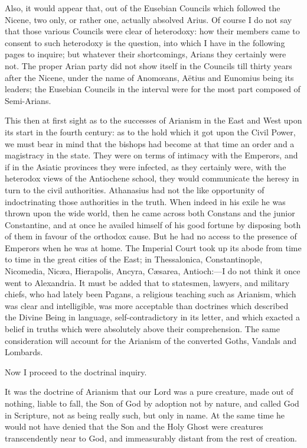 Also, it would appear that, out of the Eusebian Councils which
followed the Nicene, two only, or rather one, actually absolved Arius.
Of course I do not say that those various Councils were clear of
heterodoxy: how their members came to consent to such heterodoxy is
the question, into which I have in the following pages to inquire; but
whatever their shortcomings, Arians they certainly were not. The
proper Arian party did not show itself in the Councils till thirty
years after the Nicene, under the name of Anomœans, Aëtius and
Eunomius being its leaders; the Eusebian Councils in the interval were
for the most part composed of Semi-Arians.

This then at first sight as to the successes of Arianism in the
East and West upon its start in the fourth century: as to the hold
which it got upon the Civil Power, we must bear in mind that the
bishops had become at that time an order and a magistracy in the
state. They were on terms of intimacy with the Emperors, and if
in the Asiatic provinces they were infected, as they certainly were,
with the heterodox views of the Antiochene school, they would
communicate the heresy in turn to the civil authorities. Athanasius
had not the like opportunity of indoctrinating those authorities in
the truth. When indeed in his exile he was thrown upon the wide world,
then he came across both Constans and the junior Constantine, and at
once he availed himself of his good fortune by disposing both of them
in favour of the orthodox cause. But he had no access to the presence
of Emperors when he was at home. The Imperial Court took up its abode
from time to time in the great cities of the East; in Thessalonica,
Constantinople, Nicomedia, Nicæa, Hierapolis, Ancyra, Cæsarea,
Antioch:—I do not think it once went to Alexandria. It must be added
that to statesmen, lawyers, and military chiefs, who had lately been
Pagans, a religious teaching such as Arianism, which was clear and
intelligible, was more acceptable than doctrines which described the
Divine Being in language, self-contradictory in its letter, and which
exacted a belief in truths which were absolutely above their
comprehension. The same consideration will account for the Arianism of
the converted Goths, Vandals and Lombards.

Now I proceed to the doctrinal inquiry.


It was the doctrine of Arianism that our Lord was a pure
creature, made out of nothing, liable to fall, the Son of God by
adoption not by nature, and called God in Scripture, not as being
really such, but only in name. At the same time he would not have
denied that the Son and the Holy Ghost were creatures transcendently
near to God, and immeasurably distant from the rest of creation.

